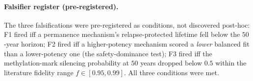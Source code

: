\documentclass[11pt,a4paper]{article}
\begin{document}
\paragraph{Falsifier register (pre-registered).} The three falsifications were
pre-registered as conditions, not discovered post-hoc: F1 fired iff a permanence
mechanism's relapse-protected lifetime fell below the $50$-year horizon; F2 fired
iff a higher-potency mechanism scored a \emph{lower} balanced fit than a
lower-potency one (the safety-dominance test); F3 fired iff the methylation-mark
silencing probability at $50$ years dropped below $0.5$ within the literature
fidelity range $f\in[0.95,0.99]$. All three conditions were met.



\end{document}
